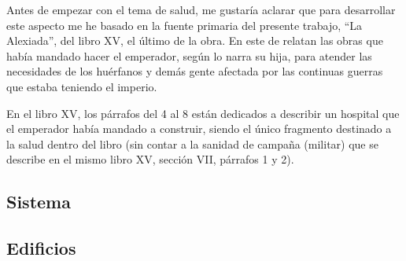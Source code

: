 

Antes de empezar con el tema de salud, me gustaría aclarar que
para desarrollar este aspecto me he basado en
la fuente primaria del 
presente trabajo, “La Alexiada”, del libro XV, el último de la obra. 
En este de relatan
las obras que había mandado hacer el emperador, 
según lo narra su hija, para atender las necesidades de
los huérfanos y demás gente afectada 
por las continuas guerras que estaba teniendo el imperio.

En el libro XV, los párrafos del 4 al 8 están dedicados a 
describir un hospital que el emperador había mandado a construir, 
siendo el único fragmento destinado a la salud dentro del libro 
(sin contar a la sanidad de campaña (militar) que se describe 
en el mismo libro XV, sección VII, párrafos 1 y 2).

\subsection{Sistema}

\subsection{Edificios}


